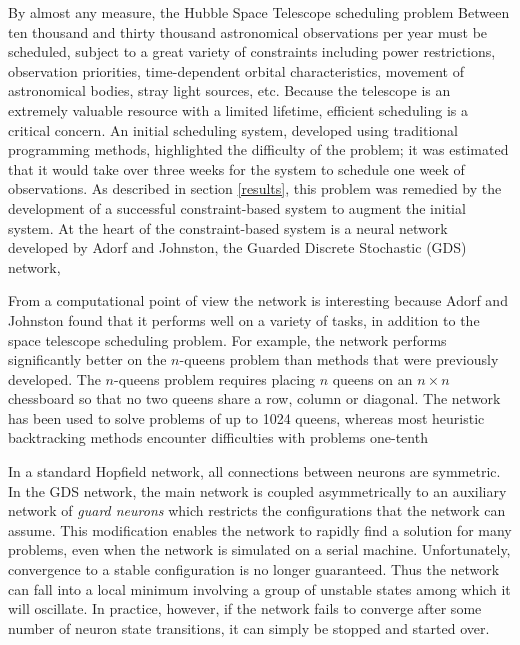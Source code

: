 \documentclass[twoside,12pt,titlepage,a4paper]{article}
\begin{document}
By almost any measure, the Hubble Space Telescope scheduling problem
Between ten thousand and thirty thousand 
astronomical observations per year must be scheduled,
subject to a great
variety of constraints including
power restrictions, observation priorities,  
time-dependent orbital characteristics, 
movement of astronomical bodies, stray
light sources, etc. Because the telescope is an extremely
valuable resource with a limited lifetime, efficient scheduling
is a critical concern. An initial scheduling system, developed
using traditional programming methods,
highlighted the difficulty of the problem;
it was estimated that it would take over three
weeks for the system to schedule one
week of observations. As described in section \ref{results},
this problem was remedied by 
the development
of a successful constraint-based system to augment the initial system.
At the heart of the constraint-based system
is a neural network developed by Adorf and Johnston, 
the Guarded Discrete Stochastic (GDS) network,

From a computational point of view the network is interesting because
Adorf and Johnston found that it performs well on a variety of tasks,
in addition to the space telescope scheduling problem. For example,
the network performs significantly better on the $n$-queens problem
than methods that were previously developed.  The $n$-queens problem
requires placing $n$ queens on an $n \times n$ chessboard so that no
two queens share a row, column or diagonal.  The network has been used
to solve problems of up to 1024 queens, whereas most heuristic
backtracking methods encounter difficulties with problems one-tenth

In a standard Hopfield network, all connections between neurons are
symmetric. In the GDS network, the main network is coupled
asymmetrically to an auxiliary network of {\em guard neurons} which
restricts the configurations that the network can assume.  This
modification enables the network to rapidly find a solution for many
problems, even when the network is simulated on a serial machine.  
Unfortunately, convergence to a stable configuration is no
longer guaranteed.  Thus the network can fall into a local minimum
involving a group of unstable states among which it will oscillate.
In practice, however, if the network fails to converge after some
number of neuron state transitions, it can simply be stopped and
started over.
\end{document}

